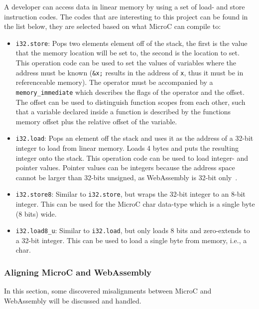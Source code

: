 \documentclass[a4paper]{article}
\begin{document}
A developer can access data in linear memory by using a set of load- and store instruction codes. The codes that are interesting to this project can be found in the list below, they are selected based on what MicroC can compile to:
\begin{itemize}
	\item \texttt{i32.store}: Pops two elements element off of the stack, the first is the value that the memory location will be set to, the second is the location to set. This operation code can be used to set the values of variables where the address must be known (\texttt{\&x;} results in the address of \texttt{x}, thus it must be in referenceable memory). The operator must be accompanied by a \texttt{memory\_immediate}\cite[\#memory-related-operators]{website:wasm-binary-encoding} which describes the flags of the operator and the offset. The offset can be used to distinguish function scopes from each other, such that a variable declared inside a function is described by the functions memory offset plus the relative offset of the variable.
	\item \texttt{i32.load}: Pops an element off the stack and uses it as the address of a 32-bit integer to load from linear memory. Loads 4 bytes and puts the resulting integer onto the stack. This operation code can be used to load integer- and pointer values. Pointer values can be integers because the address space cannot be larger than 32-bits unsigned, as WebAssembly is 32-bit only~\cite[\#addressing]{website:wasm-semantics}.
	\item \texttt{i32.store8}: Similar to \texttt{i32.store}, but wraps the 32-bit integer to an 8-bit integer. This can be used for the MicroC char data-type which is a single byte (8 bits) wide.
	\item \texttt{i32.load8\_u}: Similar to \texttt{i32.load}, but only loads 8 bits and zero-extends to a 32-bit integer. This can be used to load a single byte from memory, i.e., a char.
\end{itemize}

\subsubsection{Aligning MicroC and WebAssembly}
\label{sec:problem-analysis:webassembly:aligning}
In this section, some discovered misalignments between MicroC and WebAssembly will be discussed and handled.
\end{document}
